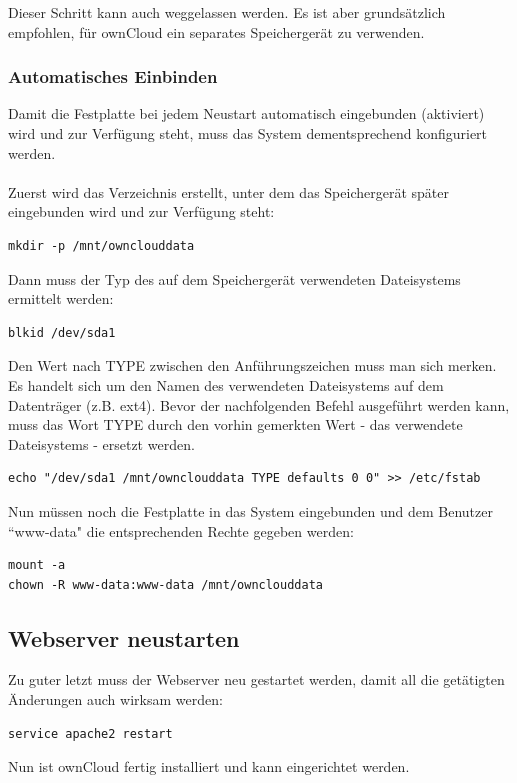 Dieser Schritt kann auch weggelassen werden. Es ist aber grundsätzlich empfohlen, für ownCloud ein separates Speichergerät zu verwenden.

\subsubsection{Automatisches Einbinden}
Damit die Festplatte bei jedem Neustart automatisch eingebunden (aktiviert) wird und zur Verfügung steht, muss das System dementsprechend konfiguriert werden. 
\\
\\
Zuerst wird das Verzeichnis erstellt, unter dem das Speichergerät später eingebunden wird und zur Verfügung steht:

\begin{lstlisting}
mkdir -p /mnt/ownclouddata
\end{lstlisting}

Dann muss der Typ des auf dem Speichergerät verwendeten Dateisystems ermittelt werden:

\begin{lstlisting}
blkid /dev/sda1
\end{lstlisting}

Den Wert nach TYPE zwischen den Anführungszeichen muss man sich merken. Es handelt sich um den Namen des verwendeten Dateisystems auf dem Datenträger (z.B. ext4).
Bevor der nachfolgenden Befehl ausgeführt werden kann, muss das Wort TYPE durch den vorhin gemerkten Wert - das verwendete Dateisystems - ersetzt werden.

\begin{lstlisting}
echo "/dev/sda1 /mnt/ownclouddata TYPE defaults 0 0" >> /etc/fstab
\end{lstlisting}

Nun müssen noch die Festplatte in das System eingebunden und dem Benutzer ``www-data" die entsprechenden Rechte gegeben werden:

\begin{lstlisting}
mount -a
chown -R www-data:www-data /mnt/ownclouddata
\end{lstlisting}

\subsection{Webserver neustarten}
Zu guter letzt muss der Webserver neu gestartet werden, damit all die getätigten Änderungen auch wirksam werden:

\begin{lstlisting}
service apache2 restart
\end{lstlisting}

Nun ist ownCloud fertig installiert und kann eingerichtet werden.